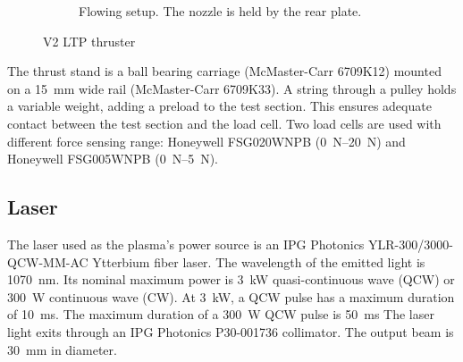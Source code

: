 \begin{figure}[!ht]
\begin{subfigure}[t]{0.45\textwidth}
                    \caption{Flowing setup. The nozzle is held by the rear plate.}
                \end{subfigure}
                \caption{V2 LTP thruster}
                \label{fig:V2 setup}
            \end{figure}

            The thrust stand is a ball bearing carriage (McMaster-Carr 6709K12) mounted on a \qty{15}{mm} wide rail (McMaster-Carr 6709K33). A string through a pulley holds a variable weight, adding a preload to the test section. This ensures adequate contact between the test section and the load cell. Two load cells are used with different force sensing range: Honeywell FSG020WNPB (\qtyrange{0}{20}{N}) and Honeywell FSG005WNPB (\qtyrange{0}{5}{N}).

        \subsection{Laser}

            The laser used as the plasma's power source is an IPG Photonics YLR-300/3000-QCW-MM-AC Ytterbium fiber laser. The wavelength of the emitted light is \qty{1070}{nm}. Its nominal maximum power is \qty{3}{kW} quasi-continuous wave (QCW) or \qty{300}{W} continuous wave (CW). At \qty{3}{kW}, a QCW pulse has a maximum duration of \qty{10}{ms}. The maximum duration of a \qty{300}{W} QCW pulse is \qty{50}{ms} The laser light exits through an IPG Photonics P30-001736 collimator. The output beam is \qty{30}{mm} in diameter.

